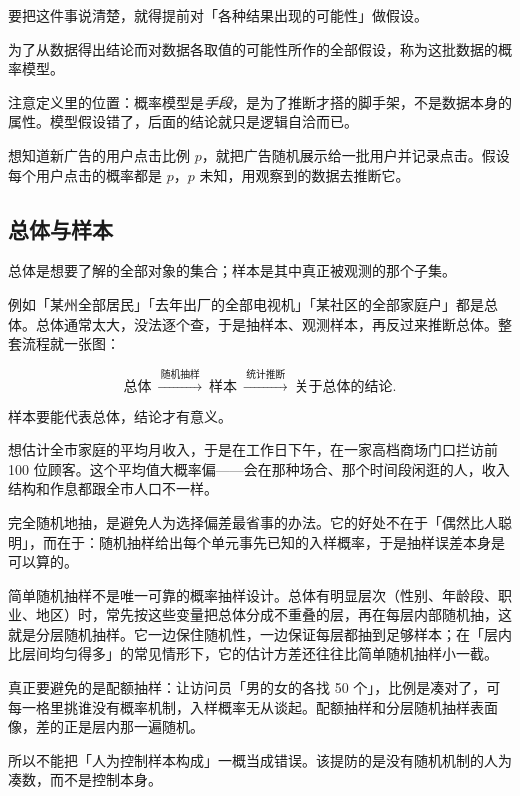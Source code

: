 要把这件事说清楚，就得提前对「各种结果出现的可能性」做假设。

\begin{definition}[概率模型]
为了从数据得出结论而对数据各取值的可能性所作的全部假设，称为这批数据的概率模型。
\end{definition}

注意定义里的位置：概率模型是\emph{手段}，是为了推断才搭的脚手架，不是数据本身的属性。模型假设错了，后面的结论就只是逻辑自洽而已。

\begin{example}[广告点击率]
想知道新广告的用户点击比例 $p$，就把广告随机展示给一批用户并记录点击。假设每个用户点击的概率都是 $p$，$p$ 未知，用观察到的数据去推断它。
\end{example}

\subsection{总体与样本}

\begin{definition}[总体与样本]
总体是想要了解的全部对象的集合；样本是其中真正被观测的那个子集。
\end{definition}

例如「某州全部居民」「去年出厂的全部电视机」「某社区的全部家庭户」都是总体。总体通常太大，没法逐个查，于是抽样本、观测样本，再反过来推断总体。整套流程就一张图：

\[
\text{总体}\ \xrightarrow{\ \text{随机抽样}\ }\ \text{样本}\ \xrightarrow{\ \text{统计推断}\ }\ \text{关于总体的结论}.
\]

样本要能代表总体，结论才有意义。

\begin{example}[商场门口问收入]
想估计全市家庭的平均月收入，于是在工作日下午，在一家高档商场门口拦访前 100 位顾客。这个平均值大概率偏——会在那种场合、那个时间段闲逛的人，收入结构和作息都跟全市人口不一样。
\end{example}

\begin{proposition}[随机的悖论]
完全随机地抽，是避免人为选择偏差最省事的办法。它的好处不在于「偶然比人聪明」，而在于：随机抽样给出每个单元事先已知的入样概率，于是抽样误差本身是可以算的。
\end{proposition}

\begin{remark}[分层随机抽样不是配额抽样]
简单随机抽样不是唯一可靠的概率抽样设计。总体有明显层次（性别、年龄段、职业、地区）时，常先按这些变量把总体分成不重叠的层，再在每层内部随机抽，这就是分层随机抽样。它一边保住随机性，一边保证每层都抽到足够样本；在「层内比层间均匀得多」的常见情形下，它的估计方差还往往比简单随机抽样小一截。

真正要避免的是配额抽样：让访问员「男的女的各找 50 个」，比例是凑对了，可每一格里挑谁没有概率机制，入样概率无从谈起。配额抽样和分层随机抽样表面像，差的正是层内那一遍随机。

所以不能把「人为控制样本构成」一概当成错误。该提防的是没有随机机制的人为凑数，而不是控制本身。
\end{remark}

